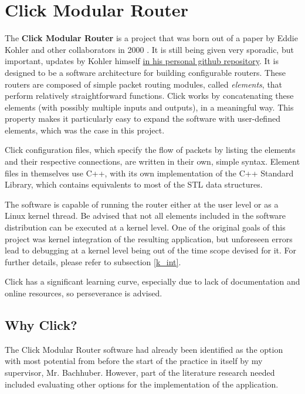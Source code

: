 \chapter{Click Modular Router}
\thispagestyle{empty}

The \textbf{Click Modular Router} is a project that was born out of a paper by Eddie Kohler and other collaborators in 2000 \cite{Kohler2000}. It is still being given very sporadic, but important, updates by Kohler himself \href{https://github.com/kohler/click}{in his personal github repository}. It is designed to be a software architecture for building configurable routers. These routers are composed of simple packet routing modules, called \textit{elements}, that perform relatively straightforward functions. Click works by concatenating these elements (with possibly multiple inputs and outputs), in a meaningful way. This property makes it particularly easy to expand the software with user-defined elements, which was the case in this project.

Click configuration files, which specify the flow of packets by listing the elements and their respective connections, are written in their own, simple syntax. Element files in themselves use C++, with its own implementation of the C++ Standard Library, which contains equivalents to most of the STL data structures. 

The software is capable of running the router either at the user level or as a Linux kernel thread. Be advised that not all elements included in the software distribution can be executed at a kernel level. One of the original goals of this project was kernel integration of the resulting application, but unforeseen errors lead to debugging at a kernel level being out of the time scope devised for it. For further details, please refer to subsection \ref{k_int}.

Click has a significant learning curve, especially due to lack of documentation and online resources, so perseverance is advised.

\section{Why Click?}

The Click Modular Router software had already been identified as the option with most potential from before the start of the practice in itself by my supervisor, Mr. Bachhuber. However, part of the literature research needed included evaluating other options for the implementation of the application.

